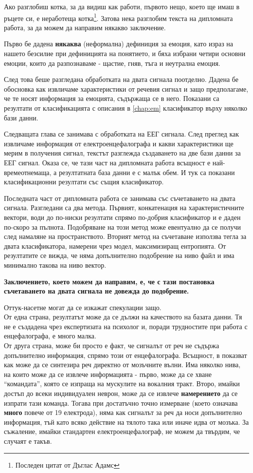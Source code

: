 \documentclass[main.tex]{subfiles}
\begin{document}
Ако разглобиш котка, за да видиш как работи, първото нещо, което ще имаш в ръцете си, е неработеща котка\footnote{Последен цитат от Дъглас Адамс}. Затова нека разглобим текста на дипломната работа, за да можем да направим някакво заключение.

Първо бе дадена \textbf{някаква} (неформална) дефиниция за емоция, като израз на нашето безсилие при дефиницията на понятието, и бяха избрани четири основни емоции, които да разпознаваме - щастие, гняв, тъга и неутрална емоция.

След това беше разгледана обработката на двата сигнала поотделно. Дадена бе обосновка как извличаме характеристики от речевия сигнал и защо предполагаме, че те носят информация за емоцията, съдържаща се в него. Показани са резултати от класификацията с описания в \autoref{chap:em} класификатор върху няколко бази данни.

Следващата глава се занимава с обработката на ЕЕГ сигнала. След преглед как извличаме информация от електроенцефалографа и какви характеристики ще мерим в получения сигнал, текстът разглежда създаването на две бази данни за ЕЕГ сигнал. Оказа се, че тази част на дипломната работа всъщност е най-времеотнемаща, а резултатната база данни е с малък обем. И тук са показани класификационни резултати със същия класификатор.

Последната част от дипломната работа се занимава със съчетаването на двата сигнала. Разгледани са два метода. Първият, конкатенация на характеристичните вектори, води до по-ниски резултати спрямо по-добрия класификатор и е даден по-скоро за пълнота. Подобряване на този метод може евентуално да се получи след намаляне на пространството. Вторият метод на съчетаване използва тегла за двата класификатора, намерени чрез модел, максимизиращ ентропията. От резултатите се вижда, че няма допълнително подобрение на ниво файл и има минимално такова на ниво вектор. 

\textbf{Заключението, което можем да направим, е, че с тази постановка съчетаването на двата сигнала не довежда до подобрение.}

Оттук-насетне могат да се изкажат спекулации защо.\\
От една страна, резултатът може да се дължи на качеството на базата данни. Тя не е създадена чрез експертизата на психолог и, поради трудностите при работа с енцефалографа, е много малка.\\
От друга страна, може би просто е факт, че сигналът от реч не съдържа допълнително информация, спрямо този от енцефалографа. Всъщност, в \cite{synt} показват как може да се синтезира реч директно от мозъчните вълни. Има няколко нива, на които може да се извлече информацията - първо, може да се хване ``командата'', която се изпраща на мускулите на вокалния тракт. Второ, имайки достъп до всеки индивидуален неврон, може да се извлече \textbf{намерението} да се изпрати тази команда. Тогава при достатъчно точно измерване (което означава \textbf{много} повече от 19 електрода), няма как сигналът за реч да носи допълнително информация, тъй като всяко действие на тялото така или иначе идва от мозъка. За съжаление, имайки стандартен електроенцефалограф, не можем да твърдим, че случаят е такъв.
\end{document}
